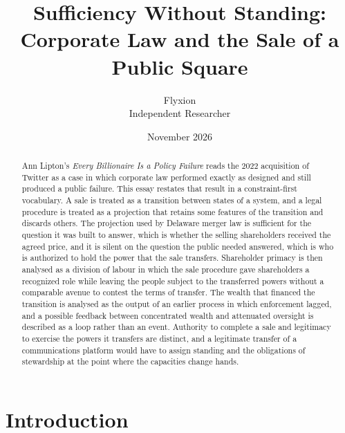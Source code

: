 \documentclass[11pt]{article}
\title{Sufficiency Without Standing: Corporate Law and the Sale of a Public Square}
\author{Flyxion\\Independent Researcher}
\date{November 2026}
\theoremstyle{definition}
\begin{document}
\maketitle

\begin{abstract}
\noindent Ann Lipton's \emph{Every Billionaire Is a Policy Failure} reads the 2022 acquisition of Twitter as a case in which corporate law performed exactly as designed and still produced a public failure. This essay restates that result in a constraint-first vocabulary. A sale is treated as a transition between states of a system, and a legal procedure is treated as a projection that retains some features of the transition and discards others. The projection used by Delaware merger law is sufficient for the question it was built to answer, which is whether the selling shareholders received the agreed price, and it is silent on the question the public needed answered, which is who is authorized to hold the power that the sale transfers. Shareholder primacy is then analysed as a division of labour in which the sale procedure gave shareholders a recognized role while leaving the people subject to the transferred powers without a comparable avenue to contest the terms of transfer. The wealth that financed the transition is analysed as the output of an earlier process in which enforcement lagged, and a possible feedback between concentrated wealth and attenuated oversight is described as a loop rather than an event. Authority to complete a sale and legitimacy to exercise the powers it transfers are distinct, and a legitimate transfer of a communications platform would have to assign standing and the obligations of stewardship at the point where the capacities change hands.
\end{abstract}

\section{Introduction}
\end{document}
